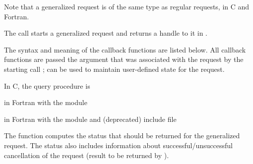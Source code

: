 \begin{users}
Note that a generalized request is of the same type as regular requests, in C and Fortran.
\end{users}

The call starts a generalized request and returns a handle to it in
.

The syntax and meaning of the callback functions are listed below.
All callback functions are passed the  argument
that was associated with the request by the starting call
;  can be used to maintain user-defined
state for the request.  

In 
C, the query procedure is

%

\par\noindent
in Fortran with the  module


\par\noindent
in Fortran with the  module and (deprecated)  include file


\par\noindent

The  function computes the status
that should be returned for the generalized request.
The status
also includes information about successful/unsuccessful cancellation of
the request (result to be returned by ).

